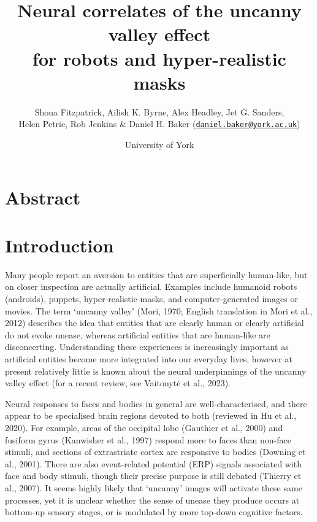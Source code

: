 \documentclass[
]{article}
\title{Neural correlates of the uncanny valley effect\\
for robots and hyper-realistic masks}
\author{Shona Fitzpatrick, Ailish K. Byrne, Alex Headley, Jet G. Sanders,\\
Helen Petrie, Rob Jenkins \& Daniel H. Baker (\href{mailto:daniel.baker@york.ac.uk}{\nolinkurl{daniel.baker@york.ac.uk}})}
\date{University of York}
\begin{document}
\maketitle

\hypertarget{abstract}{%
\section{Abstract}\label{abstract}}

\hypertarget{introduction}{%
\section{Introduction}\label{introduction}}

Many people report an aversion to entities that are superficially human-like, but on closer inspection are actually artificial. Examples include humanoid robots (androids), puppets, hyper-realistic masks, and computer-generated images or movies. The term `uncanny valley' (Mori, 1970; English translation in Mori et al., 2012) describes the idea that entities that are clearly human or clearly artificial do not evoke unease, whereas artificial entities that are human-like are disconcerting. Understanding these experiences is increasingly important as artificial entities become more integrated into our everyday lives, however at present relatively little is known about the neural underpinnings of the uncanny valley effect (for a recent review, see Vaitonytė et al., 2023).

Neural responses to faces and bodies in general are well-characterised, and there appear to be specialised brain regions devoted to both (reviewed in Hu et al., 2020). For example, areas of the occipital lobe (Gauthier et al., 2000) and fusiform gyrus (Kanwisher et al., 1997) respond more to faces than non-face stimuli, and sections of extrastriate cortex are responsive to bodies (Downing et al., 2001). There are also event-related potential (ERP) signals associated with face and body stimuli, though their precise purpose is still debated (Thierry et al., 2007). It seems highly likely that `uncanny' images will activate these same processes, yet it is unclear whether the sense of unease they produce occurs at bottom-up sensory stages, or is modulated by more top-down cognitive factors.
\end{document}
